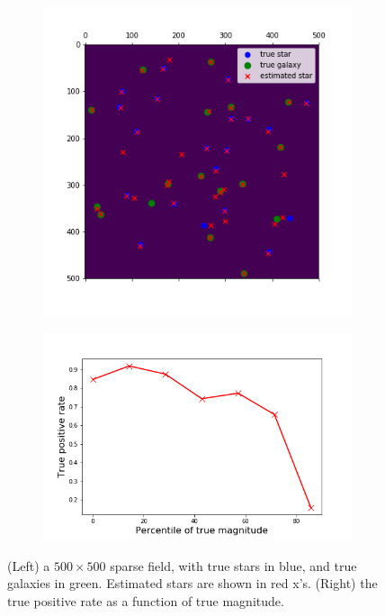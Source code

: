 \begin{figure}
    \centering
    \begin{subfigure}{0.45\textwidth}
        \includegraphics[width=\textwidth]{figures/sparse_field_detections.png}
        \label{fig:sparse_field_detect}
    \end{subfigure}
    \begin{subfigure}{0.54\textwidth}
        \includegraphics[width=\textwidth]{figures/sparse_field_tpr.png}
        \label{fig:sparse_field_tpr}
    \end{subfigure}
    \caption{(Left) a $500\times 500$ sparse field, with true stars in 
    blue, and true galaxies in green. Estimated stars are shown in red x's. 
    (Right) the true positive rate as a function of true magnitude. }
    \label{fig:sparse_field}
\end{figure}
